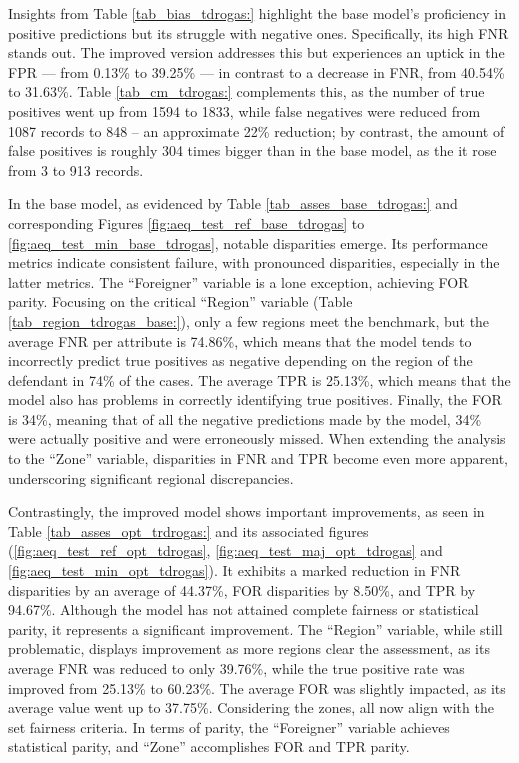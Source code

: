 \documentclass[twoside,11pt]{article}
\begin{document}
Insights from Table \ref{tab_bias_tdrogas:} highlight the base model's proficiency in positive predictions but its struggle with negative ones. Specifically, its high FNR stands out. The improved version addresses this but experiences an uptick in the FPR — from 0.13\% to 39.25\% — in contrast to a decrease in FNR, from 40.54\% to 31.63\%. Table \ref{tab_cm_tdrogas:} complements this, as the number of true positives went up from 1594 to 1833, while false negatives were reduced from 1087 records to 848 -- an approximate 22\% reduction; by contrast, the amount of false positives is roughly 304 times bigger than in the base model, as the it rose from 3 to 913 records.

In the base model, as evidenced by Table \ref{tab_asses_base_tdrogas:} and corresponding Figures \ref{fig:aeq_test_ref_base_tdrogas} to \ref{fig:aeq_test_min_base_tdrogas}, notable disparities emerge. Its performance metrics indicate consistent failure, with pronounced disparities, especially in the latter metrics. The ``Foreigner'' variable is a lone exception, achieving FOR parity. Focusing on the critical ``Region'' variable (Table \ref{tab_region_tdrogas_base:}), only a few regions meet the benchmark, but the average FNR per attribute is 74.86\%, which means that the model tends to incorrectly predict true positives as negative depending on the region of the defendant in 74\% of the cases. The average TPR is 25.13\%, which means that the model also has problems in correctly identifying true positives. Finally, the FOR is 34\%, meaning that of all the negative predictions made by the model, 34\% were actually positive and were erroneously missed. When extending the analysis to the ``Zone'' variable, disparities in FNR and TPR become even more apparent, underscoring significant regional discrepancies.

Contrastingly, the improved model shows important improvements, as seen in Table \ref{tab_asses_opt_trdrogas:} and its associated figures (\ref{fig:aeq_test_ref_opt_tdrogas}, \ref{fig:aeq_test_maj_opt_tdrogas} and \ref{fig:aeq_test_min_opt_tdrogas}). It exhibits a marked reduction in FNR disparities by an average of 44.37\%, FOR disparities by 8.50\%, and TPR by 94.67\%. Although the model has not attained complete fairness or statistical parity, it represents a significant improvement. The ``Region'' variable, while still problematic, displays improvement as more regions clear the assessment, as its average FNR was reduced to only 39.76\%, while the true positive rate was improved from 25.13\% to 60.23\%. The average FOR was slightly impacted, as its average value went up to 37.75\%. Considering the zones, all now align with the set fairness criteria. In terms of parity, the ``Foreigner'' variable achieves statistical parity, and ``Zone'' accomplishes FOR and TPR parity.
\end{document}
